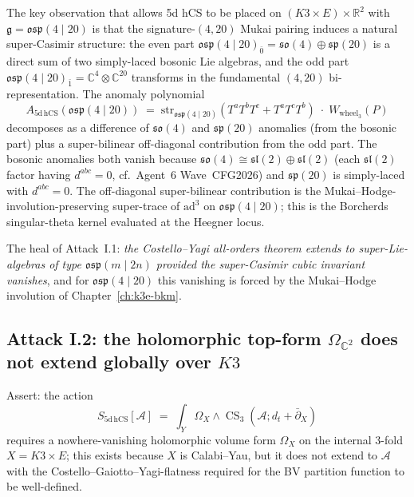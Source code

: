 The key observation that allows 5d hCS to be placed on
$(K3 \times E) \times \mathbb{R}^2$ with $\mathfrak{g} = \mathfrak{osp}(4
\mid 20)$ is that the signature-$(4,20)$ Mukai pairing induces a
natural super-Casimir structure: the even part $\mathfrak{osp}(4 \mid
20)_{\bar 0} = \mathfrak{so}(4) \oplus \mathfrak{sp}(20)$ is a direct sum
of two simply-laced bosonic Lie algebras, and the odd part
$\mathfrak{osp}(4 \mid 20)_{\bar 1} = \mathbb{C}^{4} \otimes \mathbb{C}^{20}$
transforms in the fundamental $(4,20)$ bi-representation. The anomaly
polynomial
\begin{equation}
\label{eq:anomaly-polynomial-osp}
 A_{5\mathrm{d\,hCS}}(\mathfrak{osp}(4 \mid 20))
 \;=\;
 \mathrm{str}_{\mathfrak{osp}(4 \mid 20)}(T^a T^b T^c + T^a T^c T^b)
 \; \cdot \; W_{\mathrm{wheel}_3}(P)
\end{equation}
decomposes as a difference of $\mathfrak{so}(4)$ and $\mathfrak{sp}(20)$
anomalies (from the bosonic part) plus a super-bilinear off-diagonal
contribution from the odd part. The bosonic anomalies both vanish
because $\mathfrak{so}(4) \cong \mathfrak{sl}(2) \oplus \mathfrak{sl}(2)$
(each $\mathfrak{sl}(2)$ factor having $d^{abc} = 0$, cf.\ Agent~6
Wave~CFG2026) and $\mathfrak{sp}(20)$ is simply-laced with
$d^{abc} = 0$. The off-diagonal super-bilinear contribution is the
Mukai--Hodge-involution-preserving super-trace of $\mathrm{ad}^3$ on
$\mathfrak{osp}(4 \mid 20)$; this is the Borcherds singular-theta
kernel evaluated at the Heegner locus.

The heal of Attack~I.1: \emph{the Costello--Yagi all-orders theorem
extends to super-Lie-algebras of type $\mathfrak{osp}(m \mid 2n)$
provided the super-Casimir cubic invariant vanishes}, and for
$\mathfrak{osp}(4 \mid 20)$ this vanishing is forced by the Mukai--Hodge
involution of Chapter~\ref{ch:k3e-bkm}.

\subsection*{Attack I.2: the holomorphic top-form $\Omega_{\mathbb{C}^2}$
does not extend globally over $K3$}

Assert: the action
\begin{equation}
\label{eq:5d-hCS-action-k3e}
 S_{5\mathrm{d\,hCS}}[\mathcal{A}] \;=\;
 \int_Y \Omega_X \wedge \operatorname{CS}_3(\mathcal{A};
 d_t + \bar\partial_X)
\end{equation}
requires a nowhere-vanishing holomorphic volume form $\Omega_X$ on the
internal $3$-fold $X = K3 \times E$; this exists because $X$ is
Calabi--Yau, but it does not extend to $\mathcal{A}$ with the
Costello--Gaiotto--Yagi-flatness required for the BV partition function
to be well-defined.

